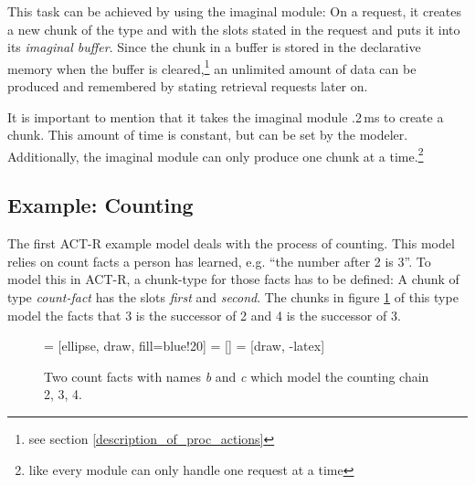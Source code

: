 This task can be achieved by using the imaginal module: On a request, it creates a new chunk of the type and with the slots stated in the request and puts it into its \emph{imaginal buffer}. Since the chunk in a buffer is stored in the declarative memory when the buffer is cleared,\footnote{see section \ref{description_of_proc_actions}} an unlimited amount of data can be produced and remembered by stating retrieval requests later on.

It is important to mention that it takes the imaginal module .2\,ms to create a chunk. This amount of time is constant, but can be set by the modeler. Additionally, the imaginal module can only produce one chunk at a time.\footnote{like every module can only handle one request at a time}

\subsection{Example: Counting}
\label{example_counting}

The first ACT-R example model deals with the process of counting. This model relies on count facts a person has learned, e.g. ``the number after 2 is 3''. To model this in ACT-R, a chunk-type for those facts has to be defined: A chunk of type \emph{count-fact} has the slots \emph{first} and \emph{second}. The chunks in figure \ref{fig:example_counting_chunks} of this type model the facts that 3 is the successor of 2 and 4 is the successor of 3.

\begin{figure}[htb]
\centering
{} = [ellipse, draw, fill=blue!20]
 = [] 
 = [draw, -latex]   

\caption{Two count facts with names \emph{b} and \emph{c} which model the counting chain 2, 3, 4.}
\label{fig:example_counting_chunks}
\end{figure}


